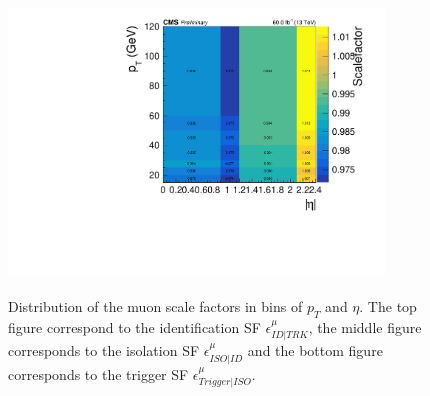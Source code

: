 \documentclass{cernatlasnote}
\begin{document}
\begin{figure}
    \includegraphics[height=8cm, width=10cm, trim= 0cm 0cm 0cm 0.cm,clip]{images/Spark/NUM_IsoMu24_or_Mu17_TrkIsoVVL_Mu8_TrkIsoVVL_DZ_Mass3p8_DEN_MiniIsoTight_and_TightID_abseta_pt.pdf}
    \caption{ Distribution of the muon scale factors in bins of $p_T$ and $\eta$. The top figure correspond to the identification SF $\epsilon^{\mu}_{ID|TRK}$, the middle figure corresponds to the isolation SF $\epsilon^{\mu}_{ISO|ID}$ and the bottom figure corresponds to the trigger SF $\epsilon^{\mu}_{Trigger|ISO}$.}
    \label{fig:SP1}
\end{figure}
\end{document}
